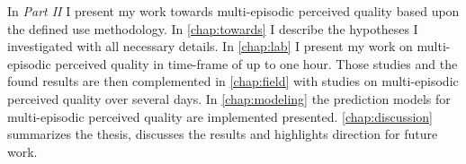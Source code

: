 In \emph{Part II} I present my work towards multi-episodic perceived quality based upon the defined use methodology.
In \autoref{chap:towards} I describe the hypotheses I investigated with all necessary details.
In \autoref{chap:lab} I present my work on multi-episodic perceived quality in time-frame of up to one hour.
Those studies and the found results are then complemented in \autoref{chap:field} with studies on multi-episodic perceived quality over several days.
In \autoref{chap:modeling} the prediction models for multi-episodic perceived quality are implemented presented.
\autoref{chap:discussion} summarizes the thesis, discusses the results and highlights direction for future work.
